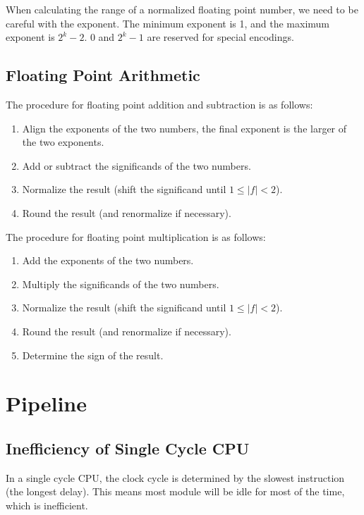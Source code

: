 \documentclass[a4paper,12pt]{article}
\begin{document}
\begin{warningbox}
	When calculating the range of a normalized floating point number, we need to be careful with the exponent. The minimum exponent is 1, and the maximum exponent is $2^k - 2$. 0 and $2^k - 1$ are reserved for special encodings.
\end{warningbox}

\subsection{Floating Point Arithmetic}

The procedure for floating point addition and subtraction is as follows:
\begin{enumerate}
	\item Align the exponents of the two numbers, the final exponent is the larger of the two exponents.
	\item Add or subtract the significands of the two numbers.
	\item Normalize the result (shift the significand until $1 \leq |f| < 2$).
	\item Round the result (and renormalize if necessary).
\end{enumerate}

The procedure for floating point multiplication is as follows:
\begin{enumerate}
	\item Add the exponents of the two numbers.
	\item Multiply the significands of the two numbers.
	\item Normalize the result (shift the significand until $1 \leq |f| < 2$).
	\item Round the result (and renormalize if necessary).
	\item Determine the sign of the result.
\end{enumerate}

\section{Pipeline}

\subsection{Inefficiency of Single Cycle CPU}

In a single cycle CPU, the clock cycle is determined by the slowest instruction (the longest delay). This means most module will be idle for most of the time, which is inefficient.
\end{document}
